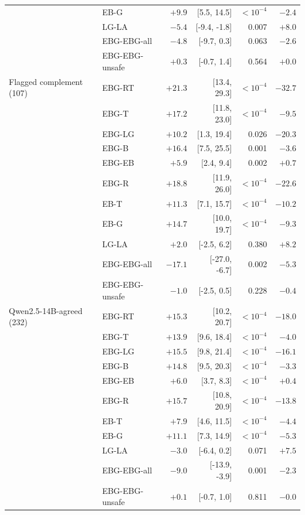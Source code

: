 \begin{longtable}{@{}llrrrr@{}}
 & EB-G & $+9.9$ & [5.5, 14.5] & $<10^{-4}$ & $-2.4$ \\
 & LG-LA & $-5.4$ & [-9.4, -1.8] & 0.007 & $+8.0$ \\
 & EBG-EBG-all & $-4.8$ & [-9.7, 0.3] & 0.063 & $-2.6$ \\
 & EBG-EBG-unsafe & $+0.3$ & [-0.7, 1.4] & 0.564 & $+0.0$ \\
\midrule
Flagged complement (107) & EBG-RT & $+21.3$ & [13.4, 29.3] & $<10^{-4}$ & $-32.7$ \\
 & EBG-T & $+17.2$ & [11.8, 23.0] & $<10^{-4}$ & $-9.5$ \\
 & EBG-LG & $+10.2$ & [1.3, 19.4] & 0.026 & $-20.3$ \\
 & EBG-B & $+16.4$ & [7.5, 25.5] & 0.001 & $-3.6$ \\
 & EBG-EB & $+5.9$ & [2.4, 9.4] & 0.002 & $+0.7$ \\
 & EBG-R & $+18.8$ & [11.9, 26.0] & $<10^{-4}$ & $-22.6$ \\
 & EB-T & $+11.3$ & [7.1, 15.7] & $<10^{-4}$ & $-10.2$ \\
 & EB-G & $+14.7$ & [10.0, 19.7] & $<10^{-4}$ & $-9.3$ \\
 & LG-LA & $+2.0$ & [-2.5, 6.2] & 0.380 & $+8.2$ \\
 & EBG-EBG-all & $-17.1$ & [-27.0, -6.7] & 0.002 & $-5.3$ \\
 & EBG-EBG-unsafe & $-1.0$ & [-2.5, 0.5] & 0.228 & $-0.4$ \\
\midrule
Qwen2.5-14B-agreed (232) & EBG-RT & $+15.3$ & [10.2, 20.7] & $<10^{-4}$ & $-18.0$ \\
 & EBG-T & $+13.9$ & [9.6, 18.4] & $<10^{-4}$ & $-4.0$ \\
 & EBG-LG & $+15.5$ & [9.8, 21.4] & $<10^{-4}$ & $-16.1$ \\
 & EBG-B & $+14.8$ & [9.5, 20.3] & $<10^{-4}$ & $-3.3$ \\
 & EBG-EB & $+6.0$ & [3.7, 8.3] & $<10^{-4}$ & $+0.4$ \\
 & EBG-R & $+15.7$ & [10.8, 20.9] & $<10^{-4}$ & $-13.8$ \\
 & EB-T & $+7.9$ & [4.6, 11.5] & $<10^{-4}$ & $-4.4$ \\
 & EB-G & $+11.1$ & [7.3, 14.9] & $<10^{-4}$ & $-5.3$ \\
 & LG-LA & $-3.0$ & [-6.4, 0.2] & 0.071 & $+7.5$ \\
 & EBG-EBG-all & $-9.0$ & [-13.9, -3.9] & 0.001 & $-2.3$ \\
 & EBG-EBG-unsafe & $+0.1$ & [-0.7, 1.0] & 0.811 & $-0.0$ \\

\end{longtable}
